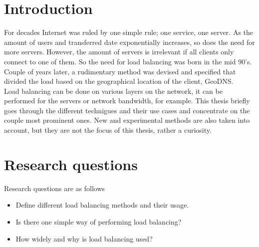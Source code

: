 \documentclass[english,12pt,a4paper,pdftex,elec,utf8]{aaltothesis}
\begin{document}
\cleardoublepage
\storeinipagenumber
{}
\setcounter{page}{1}


\section{Introduction}
For decades Internet was ruled by one simple rule; one service, one server.
As the amount of users and transferred date exponentially increases, so does the need for more servers.
However, the amount of servers is irrelevant if all clients only connect to one of them.
So the need for load balancing was born in the mid 90's.
Couple of years later, a rudimentary method was devised and specified that divided the load based on the geographical location of the client, GeoDNS.\\

Load balancing can be done on various layers on the network, it can be performed for the servers or network bandwidth, for example.
This thesis briefly goes through the different technigues and their use cases and concentrate on the couple most prominent ones.
New and experimental methods are also taken into account, but they are not the focus of this thesis, rather a curiosity.

\newpage

\section{Research questions}

Research questions are as follows
\begin{itemize}
    \item Define different load balancing methods and their usage.
    \item Is there one simple way of performing load balancing?
    \item How widely and why is load balancing used?
\end{itemize}
\newpage
\end{document}

